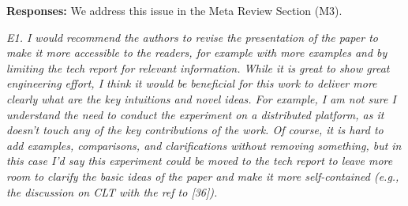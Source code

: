 \vspace{.25em}

{\bf Responses:} We address this issue in the Meta Review Section (M3).

\vspace{1em}
\emph{E1. I would recommend the authors to revise the presentation of the paper to make it more accessible to the readers, for example with more examples and by limiting the tech report for relevant information. While it is great to show great engineering effort, I think it would be beneficial for this work to deliver more clearly what are the key intuitions and novel ideas. For example, I am not sure I understand the need to conduct the experiment on a distributed platform, as it doesn't touch any of the key contributions of the work. Of course, it is hard to add examples, comparisons, and clarifications without removing something, but in this case I'd say this experiment could be moved to the tech report to leave more room to clarify the basic ideas of the paper and make it more self-contained (e.g., the discussion on CLT with the ref to [36]).}

\vspace{.25em}

